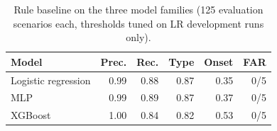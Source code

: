 \begin{table}[t]
\centering
\small
\setlength{\tabcolsep}{4pt}
\caption{Rule baseline on the three model families (125 evaluation scenarios each, thresholds tuned on LR development runs only).}
\label{tab:models}
\begin{tabular}{lrrrrr}
\toprule
Model & Prec. & Rec. & Type & Onset & FAR \\
\midrule
Logistic regression & 0.99 & 0.88 & 0.87 & 0.35 & 0/5 \\
MLP & 0.99 & 0.89 & 0.87 & 0.37 & 0/5 \\
XGBoost & 1.00 & 0.84 & 0.82 & 0.53 & 0/5 \\
\bottomrule
\end{tabular}
\end{table}
